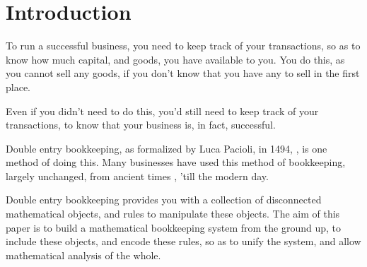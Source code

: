 \section{Introduction}

To run a successful business, you need to keep track of your transactions\footnotemark,
so as to know how much capital, and goods, you have available to you.
You do this, as you cannot sell any goods, if you don't know that you have any to sell in the first place.

Even if you didn't need to do this, you'd still need to keep track of your transactions,
to know that your business is, in fact, successful.

Double entry bookkeeping, as formalized by Luca Pacioli, in 1494, \cite{pacioli}, is one method of doing this.
Many businesses have used this method of bookkeeping, largely unchanged, from ancient times \cite{encyclopedia-britannica}, 'till the modern day.

Double entry bookkeeping provides you with a collection of disconnected mathematical objects, and rules to manipulate these objects.
The aim of this paper is to build a mathematical bookkeeping system from the ground up,
to include these objects, and encode these rules, so as to unify the system,
and allow mathematical analysis of the whole.
